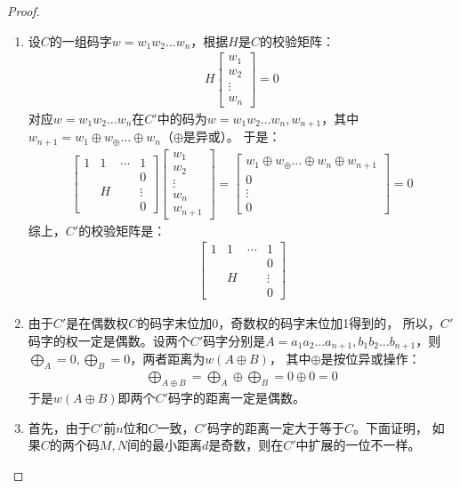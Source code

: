 \begin{proof}
   \begin{enumerate}
      \item 设$C$的一组码字$w=w_1w_2\ldots w_n$，根据$H$是$C$的校验矩阵：
      \begin{align*}
         H \left[\begin{matrix}
            w_1\\w_2\\\vdots\\w_n
         \end{matrix}\right] = 0
      \end{align*}
      对应$w=w_1w_2\ldots w_n$在$C'$中的码为$w=w_1w_2\ldots w_n,w_{n+1}$，其中
      $w_{n+1} = w_1\oplus w_\oplus \ldots\oplus w_n$（$\oplus$是异或）。
      于是：
      \begin{align*}
         \left[\begin{matrix}
             1&1&\cdots&1\\
              & & &0\\
              &H& &\vdots\\
              & & &0
         \end{matrix}\right]
         \left[\begin{matrix}
            w_1\\w_2\\\vdots\\w_n\\w_{n+1}
         \end{matrix}\right] = \left[\begin{matrix}
            w_1\oplus w_\oplus \ldots\oplus w_n\oplus w_{n+1}\\0\\\vdots\\0
         \end{matrix}\right]=0
     \end{align*}
     综上，$C'$的校验矩阵是：\begin{align*}
      \left[\begin{matrix}
          1&1&\cdots&1\\
           & & &0\\
           &H& &\vdots\\
           & & &0
      \end{matrix}\right]
  \end{align*}
      \item 由于$C'$是在偶数权$C$的码字末位加0，奇数权的码字末位加1得到的，
      所以，$C'$码字的权一定是偶数。设两个$C'$码字分别是$A=a_1a_2\ldots a_{n+1},b_1b_2\ldots b_{n+1}$，则$\bigoplus_A = 0,\bigoplus_B = 0$，两者距离为$w(A\oplus B)$，
      其中$\oplus$是按位异或操作：
      \begin{align*}
         \bigoplus_{A\oplus B} = \bigoplus_A \oplus \bigoplus_B = 0\oplus 0 =0
      \end{align*}
      于是$w(A\oplus B)$即两个$C'$码字的距离一定是偶数。
      \item 首先，由于$C'$前$n$位和$C$一致，$C'$码字的距离一定大于等于$C$。下面证明，
      如果$C$的两个码$M,N$间的最小距离$d$是奇数，则在$C'$中扩展的一位不一样。


\end{enumerate}
\end{proof}

